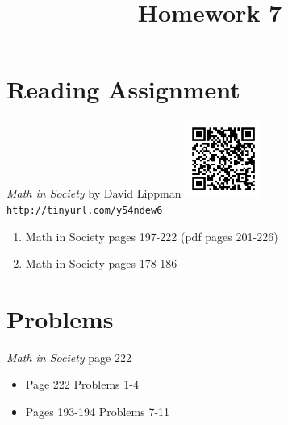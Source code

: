 \documentclass{article}
\title{Homework 7}
\date{}
\begin{document}
\maketitle

\section*{Reading Assignment}
\begin{center}
    {\em Math in Society} by David Lippman\newline
    \includegraphics[width=1in]{readings/society}\newline
    {\tt http://tinyurl.com/y54ndew6}
\end{center}
\begin{enumerate}
\item Math in Society pages 197-222 (pdf pages 201-226)
\item Math in Society pages 178-186
\end{enumerate}

\section{Problems}
{\em Math in Society} page 222
\begin{itemize}
	\item Page 222 Problems 1-4
    \item Pages 193-194 Problems 7-11
\end{itemize}
\end{document}
